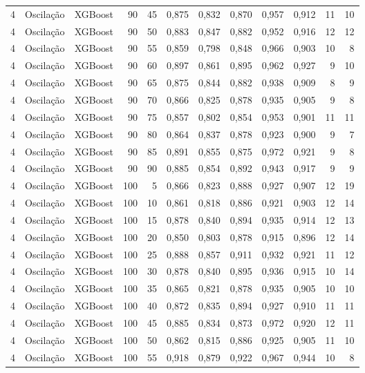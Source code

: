 \begin{longtable}{@{}rllrrrrrrrrr@{}}
4 & Oscilação & XGBoost & 90 & 45 & 0,875 & 0,832 & 0,870 & 0,957 & 0,912 & 11 & 10 \\
4 & Oscilação & XGBoost & 90 & 50 & 0,883 & 0,847 & 0,882 & 0,952 & 0,916 & 12 & 12 \\
4 & Oscilação & XGBoost & 90 & 55 & 0,859 & 0,798 & 0,848 & 0,966 & 0,903 & 10 & 8 \\
4 & Oscilação & XGBoost & 90 & 60 & 0,897 & 0,861 & 0,895 & 0,962 & 0,927 & 9 & 10 \\
4 & Oscilação & XGBoost & 90 & 65 & 0,875 & 0,844 & 0,882 & 0,938 & 0,909 & 8 & 9 \\
4 & Oscilação & XGBoost & 90 & 70 & 0,866 & 0,825 & 0,878 & 0,935 & 0,905 & 9 & 8 \\
4 & Oscilação & XGBoost & 90 & 75 & 0,857 & 0,802 & 0,854 & 0,953 & 0,901 & 11 & 11 \\
4 & Oscilação & XGBoost & 90 & 80 & 0,864 & 0,837 & 0,878 & 0,923 & 0,900 & 9 & 7 \\
4 & Oscilação & XGBoost & 90 & 85 & 0,891 & 0,855 & 0,875 & 0,972 & 0,921 & 9 & 8 \\
4 & Oscilação & XGBoost & 90 & 90 & 0,885 & 0,854 & 0,892 & 0,943 & 0,917 & 9 & 9 \\
4 & Oscilação & XGBoost & 100 & 5 & 0,866 & 0,823 & 0,888 & 0,927 & 0,907 & 12 & 19 \\
4 & Oscilação & XGBoost & 100 & 10 & 0,861 & 0,818 & 0,886 & 0,921 & 0,903 & 12 & 14 \\
4 & Oscilação & XGBoost & 100 & 15 & 0,878 & 0,840 & 0,894 & 0,935 & 0,914 & 12 & 13 \\
4 & Oscilação & XGBoost & 100 & 20 & 0,850 & 0,803 & 0,878 & 0,915 & 0,896 & 12 & 14 \\
4 & Oscilação & XGBoost & 100 & 25 & 0,888 & 0,857 & 0,911 & 0,932 & 0,921 & 11 & 12 \\
4 & Oscilação & XGBoost & 100 & 30 & 0,878 & 0,840 & 0,895 & 0,936 & 0,915 & 10 & 14 \\
4 & Oscilação & XGBoost & 100 & 35 & 0,865 & 0,821 & 0,878 & 0,935 & 0,905 & 10 & 10 \\
4 & Oscilação & XGBoost & 100 & 40 & 0,872 & 0,835 & 0,894 & 0,927 & 0,910 & 11 & 11 \\
4 & Oscilação & XGBoost & 100 & 45 & 0,885 & 0,834 & 0,873 & 0,972 & 0,920 & 12 & 11 \\
4 & Oscilação & XGBoost & 100 & 50 & 0,862 & 0,815 & 0,886 & 0,925 & 0,905 & 11 & 10 \\
4 & Oscilação & XGBoost & 100 & 55 & 0,918 & 0,879 & 0,922 & 0,967 & 0,944 & 10 & 8 \\

\end{longtable}
